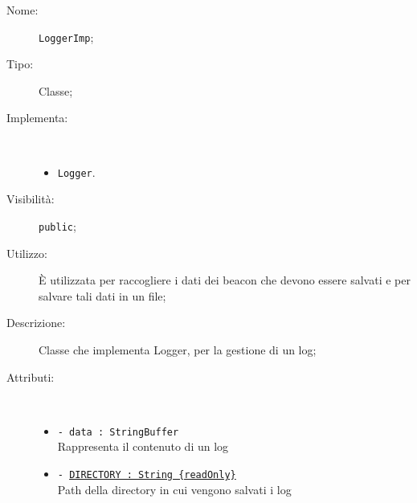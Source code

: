\documentclass[../DefinizioneDiProdotto.tex]{subfiles}
\begin{document}
\begin{description}
	\item[Nome:] \texttt{LoggerImp};
	\item[Tipo:] Classe;
	\item[Implementa:] \
	\begin{itemize}
		\item \texttt{Logger}.
		
	\end{itemize}
	\item[Visibilità:] \texttt{public};
	\item[Utilizzo:] È utilizzata per raccogliere i dati dei beacon che devono essere salvati e per salvare tali dati in un file;
	\item[Descrizione:] Classe che implementa Logger, per la gestione di un log;
	\item[Attributi:] \
	\begin{itemize}
		\item \texttt{- data : StringBuffer}\\
		Rappresenta il contenuto di un log
		
		\item \texttt{- \underline{DIRECTORY : String \{readOnly\}}}\\
		Path della directory in cui vengono salvati i log
		

\end{itemize}
\end{description}
\end{document}
